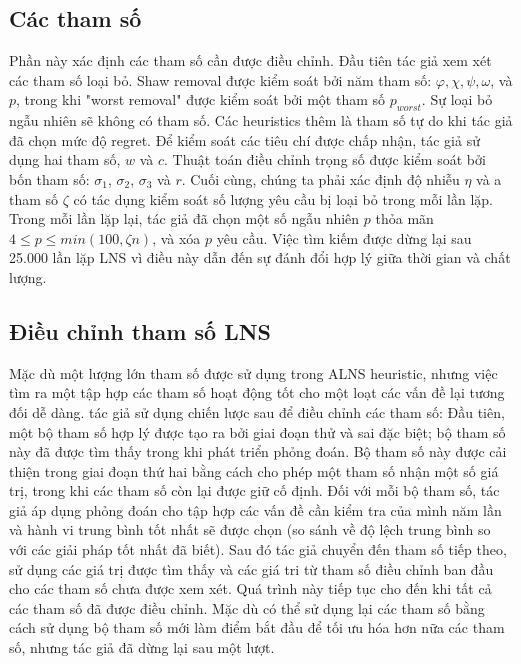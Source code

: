 \subsection{Các tham số}
Phần này xác định các tham số cần được điều chỉnh. Đầu tiên tác giả xem xét các tham số loại bỏ. Shaw removal được kiểm soát bởi năm tham số: $\varphi, \chi, \psi, \omega$, và $p$, trong khi "worst removal" được kiểm soát bởi một tham số $p_{worst}$. Sự loại bỏ ngẫu nhiên sẽ không có tham số. Các heuristics thêm là tham số tự do khi tác giả đã chọn mức độ regret.
Để kiểm soát các tiêu chí được chấp nhận, tác giả sử dụng hai tham số, $w$ và $c$. Thuật toán điều chỉnh trọng số được kiểm soát bởi bốn tham số: $\sigma_1$, $\sigma_2$, $\sigma_3$ và $r$. Cuối cùng, chúng ta phải xác định độ nhiễu $\eta$ và a tham số $\zeta$ có tác dụng kiểm soát số lượng yêu cầu bị loại bỏ trong mỗi lần lặp. Trong mỗi lần lặp lại, tác giả đã chọn một số ngẫu nhiên $p$ thỏa mãn $4 \leq p \leq min(100, \zeta n)$, và xóa $p$ yêu cầu. Việc tìm kiếm được dừng lại sau 25.000 lần lặp LNS vì điều này dẫn đến sự đánh đổi hợp lý giữa thời gian và chất lượng.

\subsection{Điều chỉnh tham số LNS}
Mặc dù một lượng lớn tham số được sử dụng trong ALNS heuristic, nhưng việc tìm ra một tập hợp các tham số hoạt động tốt cho một loạt các vấn đề lại tương đối dễ dàng. tác giả sử dụng chiến lược sau để điều chỉnh các tham số: Đầu tiên, một bộ tham số hợp lý được tạo ra bởi giai đoạn thử và sai đặc biệt; bộ tham số này đã được tìm thấy trong khi phát triển phỏng đoán. Bộ tham số này được cải thiện trong giai đoạn thứ hai bằng cách cho phép một tham số nhận một số giá trị, trong khi các tham số còn lại được giữ cố định. Đối với mỗi bộ tham số, tác giả áp dụng phỏng đoán cho tập hợp các vấn đề cần kiểm tra của mình năm lần và hành vi trung bình tốt nhất sẽ được chọn (so sánh về độ lệch trung bình so với các giải pháp tốt nhất đã biết). Sau đó tác giả chuyển đến tham số tiếp theo, sử dụng các giá trị được tìm thấy và các giá tri từ tham số điều chỉnh ban đầu cho các tham số chưa được xem xét. Quá trình này tiếp tục cho đến khi tất cả các tham số đã được điều chỉnh. Mặc dù có thể sử dụng lại các tham số bằng cách sử dụng bộ tham số mới làm điểm bắt đầu để tối ưu hóa hơn nữa các tham số, nhưng tác giả đã dừng lại sau một lượt.

